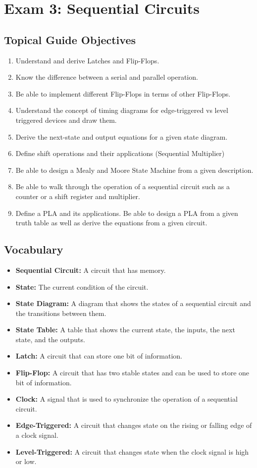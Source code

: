 \documentclass[12pt]{article}
\begin{document}
\section{Exam 3: Sequential Circuits}
\subsection{Topical Guide Objectives}
\begin{enumerate}
	\item Understand and derive Latches and Flip-Flops.
	\item Know the difference between a serial and parallel operation.
	\item Be able to implement different Flip-Flops in terms of other Flip-Flops.
	\item Understand the concept of timing diagrams for edge-triggered vs
	      level triggered devices and draw them.
	\item Derive the next-state and output equations for a given state
	      diagram.
	\item Define shift operations and their applications (Sequential Multiplier)
	\item Be able to design a Mealy and Moore State Machine from a given
	      description.
	\item Be able to walk through the operation of a sequential circuit such
	      as a counter or a shift register and multiplier.
	\item Define a PLA and its applications. Be able to design a PLA from a
	      given truth table as well as derive the equations from a given
	      circuit.
\end{enumerate}
\subsection{Vocabulary}
\begin{itemize}
	\item \textbf{Sequential Circuit:} A circuit that has memory.
	\item \textbf{State:} The current condition of the circuit.
	\item \textbf{State Diagram:} A diagram that shows the states of a
	      sequential circuit and the transitions between them.
	\item \textbf{State Table:} A table that shows the current state, the
	      inputs, the next state, and the outputs.
	\item \textbf{Latch:} A circuit that can store one bit of information.
	\item \textbf{Flip-Flop:} A circuit that has two stable states and can
	      be used to store one bit of information.
	\item \textbf{Clock:} A signal that is used to synchronize the
	      operation of a sequential circuit.
	\item \textbf{Edge-Triggered:} A circuit that changes state on the
	      rising or falling edge of a clock signal.
	\item \textbf{Level-Triggered:} A circuit that changes state when the
	      clock signal is high or low.
\end{itemize}
\end{document}
